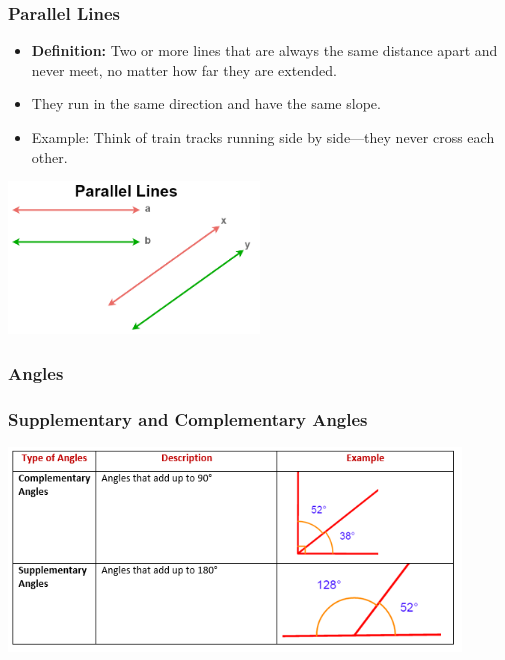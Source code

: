 \documentclass{beamer}
\begin{document}
\begin{frame}
    \frametitle{Parallel Lines}
    
    \begin{itemize}
        \item \textbf{Definition:} Two or more lines that are always the same distance apart and never meet, no matter how far they are extended.
        \item They run in the same direction and have the same slope.
        \item Example: Think of train tracks running side by side—they never cross each other.
    \end{itemize}
    
    \begin{center}
        \includegraphics[width=0.5\textwidth]{Parallellines.png} %
    \end{center}

\end{frame}
\begin{frame}
    \frametitle{Angles}
\end{frame}

\begin{frame}
    \frametitle{Supplementary and Complementary Angles}
       
    \begin{center}
        \includegraphics[width=0.9\textwidth]{complementary_supplementary_angles.png} %
    \end{center}

\end{frame}
\end{document}
